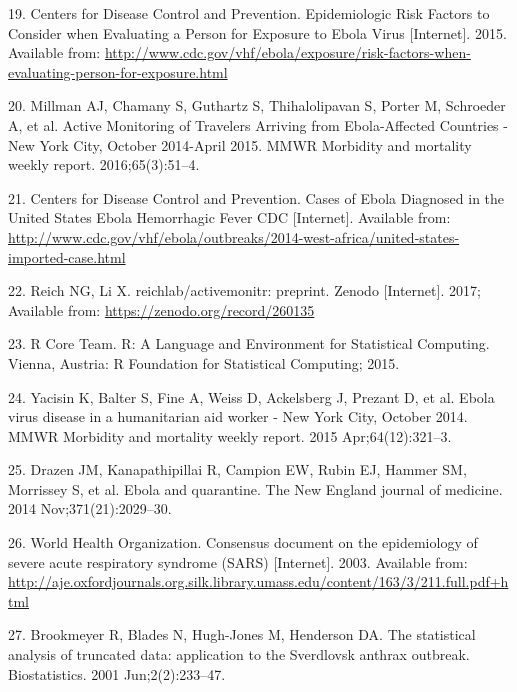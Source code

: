 \documentclass[]{article}
\begin{document}
\hypertarget{ref-CentersforDiseaseControlandPrevention:2015tc}{}
19. Centers for Disease Control and Prevention. Epidemiologic Risk
Factors to Consider when Evaluating a Person for Exposure to Ebola Virus
{[}Internet{]}. 2015. Available from:
\url{http://www.cdc.gov/vhf/ebola/exposure/risk-factors-when-evaluating-person-for-exposure.html}

\hypertarget{ref-Millman:2016cz}{}
20. Millman AJ, Chamany S, Guthartz S, Thihalolipavan S, Porter M,
Schroeder A, et al. Active Monitoring of Travelers Arriving from
Ebola-Affected Countries - New York City, October 2014-April 2015. MMWR
Morbidity and mortality weekly report. 2016;65(3):51--4.

\hypertarget{ref-CentersforDiseaseControlandPrevention:VbDBWqNH}{}
21. Centers for Disease Control and Prevention. Cases of Ebola Diagnosed
in the United States \textbar{} Ebola Hemorrhagic Fever \textbar{} CDC
{[}Internet{]}. Available from:
\url{http://www.cdc.gov/vhf/ebola/outbreaks/2014-west-africa/united-states-imported-case.html}

\hypertarget{ref-Reich:2017z}{}
22. Reich NG, Li X. reichlab/activemonitr: preprint. Zenodo
{[}Internet{]}. 2017; Available from:
\url{https://zenodo.org/record/260135}

\hypertarget{ref-rcoreteam}{}
23. R Core Team. R: A Language and Environment for Statistical
Computing. Vienna, Austria: R Foundation for Statistical Computing;
2015.

\hypertarget{ref-Yacisin:2015wm}{}
24. Yacisin K, Balter S, Fine A, Weiss D, Ackelsberg J, Prezant D, et
al. Ebola virus disease in a humanitarian aid worker - New York City,
October 2014. MMWR Morbidity and mortality weekly report. 2015
Apr;64(12):321--3.

\hypertarget{ref-Drazen:2014iz}{}
25. Drazen JM, Kanapathipillai R, Campion EW, Rubin EJ, Hammer SM,
Morrissey S, et al. Ebola and quarantine. The New England journal of
medicine. 2014 Nov;371(21):2029--30.

\hypertarget{ref-WorldHealthOrganization:QuWKXo2f}{}
26. World Health Organization. Consensus document on the epidemiology of
severe acute respiratory syndrome (SARS) {[}Internet{]}. 2003. Available
from:
\url{http://aje.oxfordjournals.org.silk.library.umass.edu/content/163/3/211.full.pdf+html}

\hypertarget{ref-Brookmeyer:2001gx}{}
27. Brookmeyer R, Blades N, Hugh-Jones M, Henderson DA. The statistical
analysis of truncated data: application to the Sverdlovsk anthrax
outbreak. Biostatistics. 2001 Jun;2(2):233--47.
\end{document}
